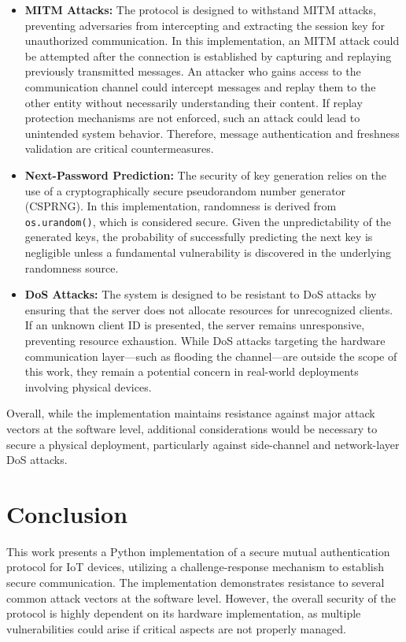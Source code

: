 \documentclass[10pt,twocolumn,letterpaper]{article}
\begin{document}
\begin{itemize}
    \item \textbf{MITM Attacks:}  
    The protocol is designed to withstand MITM attacks, preventing adversaries from intercepting and extracting the session key for unauthorized communication. In this implementation, an MITM attack could be attempted after the connection is established by capturing and replaying previously transmitted messages. An attacker who gains access to the communication channel could intercept messages and replay them to the other entity without necessarily understanding their content. If replay protection mechanisms are not enforced, such an attack could lead to unintended system behavior. Therefore, message authentication and freshness validation are critical countermeasures.

    \item \textbf{Next-Password Prediction:}  
    The security of key generation relies on the use of a cryptographically secure pseudorandom number generator (CSPRNG). In this implementation, randomness is derived from \texttt{os.urandom()}, which is considered secure. Given the unpredictability of the generated keys, the probability of successfully predicting the next key is negligible unless a fundamental vulnerability is discovered in the underlying randomness source.

    \item \textbf{DoS Attacks:}  
    The system is designed to be resistant to DoS attacks by ensuring that the server does not allocate resources for unrecognized clients. If an unknown client ID is presented, the server remains unresponsive, preventing resource exhaustion. While DoS attacks targeting the hardware communication layer—such as flooding the channel—are outside the scope of this work, they remain a potential concern in real-world deployments involving physical devices.
\end{itemize}

Overall, while the implementation maintains resistance against major attack vectors at the software level, additional considerations would be necessary to secure a physical deployment, particularly against side-channel and network-layer DoS attacks.

\section{Conclusion}
This work presents a Python implementation of a secure mutual authentication protocol for IoT devices, utilizing a challenge-response mechanism to establish secure communication. The implementation demonstrates resistance to several common attack vectors at the software level. However, the overall security of the protocol is highly dependent on its hardware implementation, as multiple vulnerabilities could arise if critical aspects are not properly managed.
\end{document}

